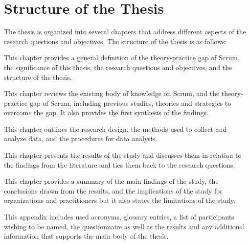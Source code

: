 \section{Structure of the Thesis}\label{sec:StructureThesis}
The thesis is organized into several chapters that address different aspects of the research questions and objectives. The structure of the thesis is as follows:

\begin{description}[style=nextline]
    \item[Chapter \ref{cha:Introduction}: Introduction]
    This chapter provides a general definition of the theory-practice gap of Scrum, the significance of this thesis, the research questions and objectives, and the structure of the thesis.
    \item[Chapter \ref{cha:LiteratureReview}: Literature Review]
    This chapter reviews the existing body of knowledge on Scrum, and the theory-practice gap of Scrum, including previous studies, theories and strategies to overcome the gap. It also provides the first synthesis of the findings.
    \item[Chapter \ref{cha:Method}: Method]
    This chapter outlines the research design, the methods used to collect and analyze data, and the procedures for data analysis.
    \item[Chapter \ref{cha:Discussion}: Discussion]
    This chapter presents the results of the study and discusses them in relation to the findings from the literature and ties them back to the research questions.
    \item[Chapter \ref{cha:Conclusion}: Conclusion]
    This chapter provides a summary of the main findings of the study, the conclusions drawn from the results, and the implications of the study for organizations and practitioners but it also states the limitations of the study.
    \item[Appendix]
    This appendix includes used acronyms, glossary entries, a list of participants wishing to be named, the questionnaire as well as the results and any additional information that supports the main body of the thesis.
\end{description}